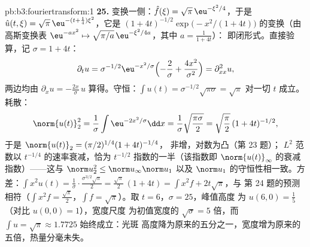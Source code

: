 \begin{solution}{pb:b3:fouriertransform:1}
\textbf{25.} 变换一侧：$\hat f(\xi) =
\sqrt\pi\,\eu^{-\xi^2/4}$，于是 $\hat u(t,\xi) =
\sqrt\pi\,\eu^{-(t + \frac14)\xi^2}$，它是
$(1 + 4t)^{-1/2}\exp\bigl(-x^2/(1+4t)\bigr)$ 的变换（由
高斯变换表 $\eu^{-ax^2} \mapsto
\sqrt{\pi/a}\,\eu^{-\xi^2/4a}$，其中 $a = \frac1{1+4t}$）：
即闭形式。直接验算，记 $\sigma = 1 + 4t$：
\[
\partial_tu = \sigma^{-1/2}\eu^{-x^2/\sigma}
\Bigl(-\frac2\sigma + \frac{4x^2}{\sigma^2}\Bigr)
= \partial^2_{xx}u ,
\]
两边均由 $\partial_xu =
-\frac{2x}\sigma\,u$ 算得。守恒：$\int u(t) =
\sigma^{-1/2}\sqrt{\pi\sigma} = \sqrt\pi$ 对一切 $t$ 成立。
耗散：
\[
\norm{u(t)}_2^2 = \frac1\sigma\int\eu^{-2x^2/\sigma}\dd x
= \frac1\sigma\sqrt{\frac{\pi\sigma}2}
= \sqrt{\frac\pi2}\,(1+4t)^{-1/2},
\]
于是 $\norm{u(t)}_2 = (\pi/2)^{1/4}(1+4t)^{-1/4}$，
非增，对数为凸（第 23 题）；
$L^2$ 范数以 $t^{-1/4}$ 的速率衰减，恰为
$t^{-1/2}$ 指数的一半（该指数即 $\norm{u(t)}_\infty$ 的衰减指数）——这与
$\norm u_2^2 \leq \norm u_\infty\norm u_1$ 以及
$\norm u_1$ 的守恒性相一致。方差：$\int x^2u(t) =
\frac1\sigma\cdot\frac{\sigma^{3/2}\sqrt\pi}2 =
\frac{\sqrt\pi}2\,(1 + 4t) = \int x^2f + 2t\sqrt\pi$，与
第 24 题的预测相符（$\int x^2f = \frac{\sqrt\pi}2$，$\int
f = \sqrt\pi$）。取 $t = 6$，$\sigma = 25$，峰值高度
为 $u(6, 0) = \frac15$（对比 $u(0,0) = 1$），宽度尺度
为初值宽度的 $\sqrt\sigma = 5$ 倍，而 $\int u =
\sqrt\pi \approx 1.7725$ 始终成立：光斑
高度降为原来的五分之一，宽度增为原来的五倍，热量分毫未失。
\end{solution}

